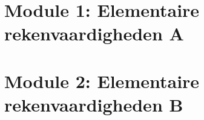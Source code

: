 \documentclass[11pt]{article}
\begin{document}
\section{Module 1: Elementaire rekenvaardigheden A}
%
%
%

%
%
%

%
\section{Module 2: Elementaire rekenvaardigheden B}
%
%



\begin{tabular}{ccc}
\end{tabular}



%
%

%
%
%
%
%
%
%
%
%
\end{document}
